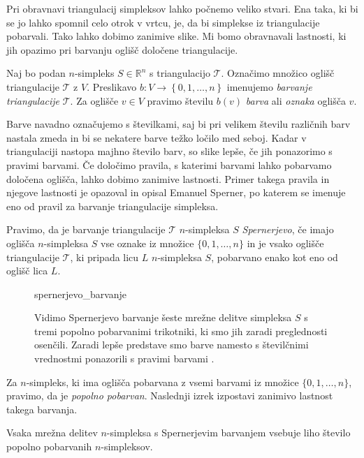 \documentclass[mat1]{fmfdelo}
\newcommand{\R}{\mathbb R}
\newcommand{\0}{0}
\newcommand{\pT}{\mathcal T}
\begin{document}
Pri obravnavi triangulacij simpleksov lahko počnemo veliko stvari. Ena taka, ki bi se jo lahko spomnil celo otrok v vrtcu, je, da bi simplekse iz triangulacije pobarvali. Tako lahko dobimo zanimive slike. Mi bomo obravnavali lastnosti, ki jih opazimo pri barvanju oglišč določene triangulacije.
\begin{definicija}
Naj bo podan $n$-simpleks $S \in \R^n$ s triangulacijo $\pT$. Označimo množico oglišč triangulacije $\pT$ z $V$. Preslikavo $b : V \to \left \{0, 1, \dots, n \right \} $ imenujemo \emph{barvanje triangulacije} $\pT$. Za oglišče $v \in V$ pravimo številu $b(v)$ \emph{barva} ali \emph{oznaka} oglišča $v$.
\end{definicija}
Barve navadno označujemo s številkami, saj bi pri velikem številu različnih barv nastala zmeda in bi se nekatere barve težko ločilo med seboj. Kadar v triangulaciji nastopa majhno število barv, so slike lepše, če jih ponazorimo s pravimi barvami. Če določimo pravila, s katerimi barvami lahko pobarvamo določena oglišča, lahko dobimo zanimive lastnosti. Primer takega pravila in njegove lastnosti je opazoval in opisal Emanuel Sperner, po katerem se imenuje eno od pravil za barvanje triangulacije simpleksa.
\begin{definicija}
Pravimo, da je barvanje triangulacije $\pT$ $n$-simpleksa $S$ \emph{Spernerjevo}, če imajo oglišča $n$-simpleksa $S$ vse oznake iz množice $\{ 0, 1, \dots, n \}$ in je vsako oglišče triangulacije $\pT$, ki pripada licu $L$ $n$-simpleksa $S$, pobarvano enako kot eno od oglišč lica $L$.
\end{definicija}
\begin{figure}[h!]    
	\centering
		{spernerjevo_barvanje}
	\caption{Vidimo Spernerjevo barvanje šeste mrežne delitve simpleksa $S$ s tremi popolno pobarvanimi trikotniki, ki smo jih zaradi preglednosti osenčili. Zaradi lepše predstave smo barve namesto s številčnimi vrednostmi ponazorili s pravimi barvami .}
\end{figure}
Za $n$-simpleks, ki ima oglišča pobarvana z vsemi barvami iz množice $\{ 0, 1, \dots, n \}$, pravimo, da je \emph{popolno pobarvan}. Naslednji izrek izpostavi zanimivo lastnost takega barvanja.
\begin{lema}\label{izr:sperner}
Vsaka mrežna delitev $n$-simpleksa s Spernerjevim barvanjem vsebuje liho število popolno pobarvanih $n$-simpleksov.
\end{lema}
\end{document}
